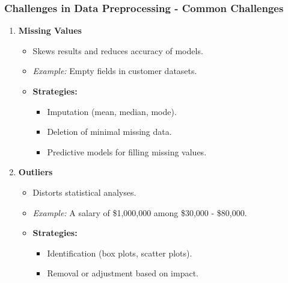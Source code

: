 \documentclass[aspectratio=169]{beamer}
\begin{document}
\begin{frame}[fragile]
    \frametitle{Challenges in Data Preprocessing - Common Challenges}
    \begin{enumerate}
        \item \textbf{Missing Values}
        \begin{itemize}
            \item Skews results and reduces accuracy of models.
            \item \textit{Example:} Empty fields in customer datasets.
            \item \textbf{Strategies:}
            \begin{itemize}
                \item Imputation (mean, median, mode).
                \item Deletion of minimal missing data.
                \item Predictive models for filling missing values.
            \end{itemize}
        \end{itemize}
        \item \textbf{Outliers}
        \begin{itemize}
            \item Distorts statistical analyses.
            \item \textit{Example:} A salary of \$1,000,000 among \$30,000 - \$80,000.
            \item \textbf{Strategies:}
            \begin{itemize}
                \item Identification (box plots, scatter plots).
                \item Removal or adjustment based on impact.
            \end{itemize}
        \end{itemize}
    \end{enumerate}
\end{frame}
\end{document}
